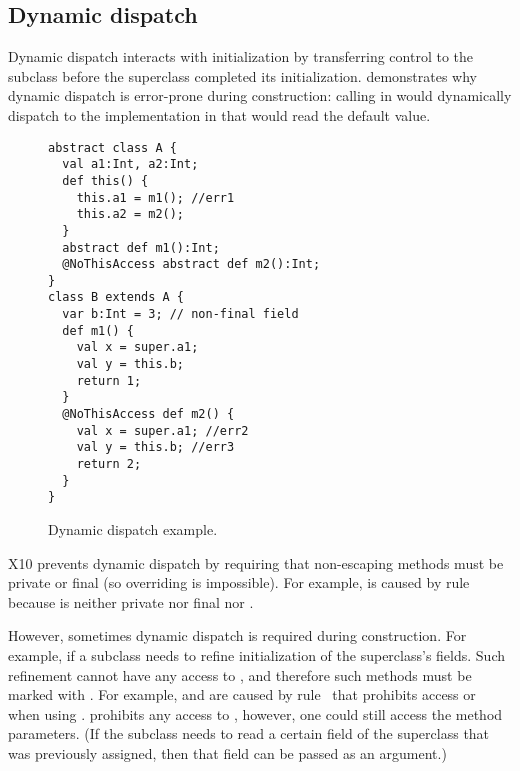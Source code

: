 \vspace{-0.2cm}
\subsection{Dynamic dispatch}
Dynamic dispatch interacts with initialization by transferring control to the subclass
    before the superclass completed its initialization.
 demonstrates why dynamic dispatch is error-prone during construction:
    calling  in  would dynamically dispatch
    to the implementation in 
    that would read the default value.



\begin{figure}
\vspace{-0.2cm}\begin{lstlisting}
abstract class A {
  val a1:Int, a2:Int;
  def this() {
    this.a1 = m1(); //err1
    this.a2 = m2();
  }
  abstract def m1():Int;
  @NoThisAccess abstract def m2():Int;
}
class B extends A {
  var b:Int = 3; // non-final field
  def m1() {
    val x = super.a1;
    val y = this.b;
    return 1;
  }
  @NoThisAccess def m2() {
    val x = super.a1; //err2
    val y = this.b; //err3
    return 2;
  }
}
\end{lstlisting}\vspace{-0.2cm}
\caption{Dynamic dispatch example.
    }
\label{Figure:Dynamic-dispatch}
\end{figure}


X10 prevents dynamic dispatch by requiring that non-escaping methods
    must be private or final
    (so overriding is impossible).
For example,  is caused by rule~
    because  is neither private nor final nor .

However, sometimes dynamic dispatch is required during construction.
For example, if a subclass needs to refine initialization
    of the superclass's fields.
Such refinement cannot have any access to \this, and therefore
    such methods must be marked with .
For example,  and  are caused by rule~ that prohibits access \this or 
    when using .
 prohibits any access to \this,
    however, one could still access the method parameters.
(If the subclass needs to read a certain field of the superclass that was previously assigned,
    then that field can be passed as an argument.) %


